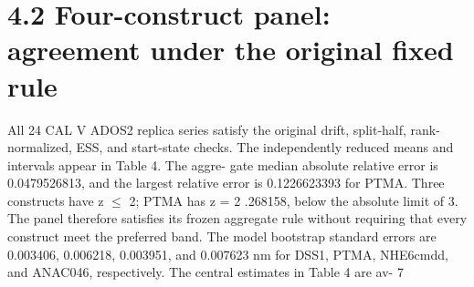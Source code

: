 \documentclass[11pt]{article}
\begin{document}
\section*{4.2 Four-construct panel: agreement under the original fixed rule}

All 24 CAL V ADOS2 replica series satisfy the original drift, split-half, rank-normalized, ESS, and
start-state checks. The independently reduced means and intervals appear in Table 4. The aggre-
gate median absolute relative error is 0.0479526813, and the largest relative error is 0.1226623393
for PTMA. Three constructs have z \ensuremath{\leq} 2; PTMA has z = 2 .268158, below the absolute limit of 3.
The panel therefore satisfies its frozen aggregate rule without requiring that every construct meet
the preferred band.
The model bootstrap standard errors are 0.003406, 0.006218, 0.003951, and 0.007623 nm for
DSS1, PTMA, NHE6cmdd, and ANAC046, respectively. The central estimates in Table 4 are av-
7
\end{document}
